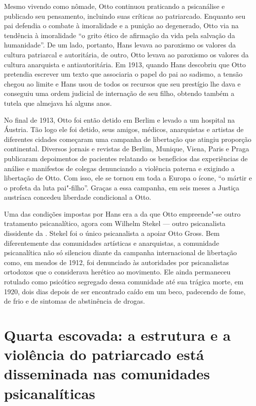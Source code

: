 Mesmo vivendo como nômade, Otto continuou praticando a psicanálise e
publicado seu pensamento, incluindo suas críticas ao patriarcado.
Enquanto seu pai defendia o combate à imoralidade e a punição ao
degenerado, Otto via na tendência à imoralidade ``o grito ético de
afirmação da vida pela salvação da humanidade''. De um lado, portanto,
Hans levava ao paroxismo os valores da cultura patriarcal e autoritária,
de outro, Otto levava ao paroxismo os valores da cultura anarquista e
antiautoritária. Em 1913, quando Hans descobriu que Otto pretendia
escrever um texto que associaria o papel do pai ao sadismo, a tensão
chegou ao limite e Hans usou de todos os recursos que seu prestígio lhe
dava e conseguiu uma ordem judicial de internação de seu filho, obtendo
também a tutela que almejava há alguns anos.

No final de 1913, Otto foi então detido em Berlim e levado a um hospital
na Áustria. Tão logo ele foi detido, seus amigos, médicos, anarquistas e
artistas de diferentes cidades começaram uma campanha de libertação que
atingiu proporção continental. Diversos jornais e revistas de Berlim,
Munique, Viena, Paris e Praga publicaram depoimentos de pacientes
relatando os benefícios das experiências de análise e manifestos de
colegas denunciando a violência paterna e exigindo a libertação de Otto.
Com isso, ele se tornou em toda a Europa o ícone, ``o mártir e o profeta
da luta pai"-filho''. Graças a essa campanha, em seis meses a Justiça
austríaca concedeu liberdade condicional a Otto.

Uma das condições impostas por Hans era a da que Otto empreende"-se outro
tratamento psicanalítico, agora com Wilhelm Stekel --- outro psicanalista
dissidente da . Stekel foi o único psicanalista a apoiar Otto Gross.
Bem diferentemente das comunidades artísticas e anarquistas, a
comunidade psicanalítica não só silenciou diante da campanha
internacional de libertação como, em meados de 1912, foi denunciado às
autoridades por psicanalistas ortodoxos que o considerava herético ao
movimento. Ele ainda permaneceu rotulado como psicótico segregado dessa
comunidade até sua trágica morte, em 1920, dois dias depois de ser
encontrado caído em um beco, padecendo de fome, de frio e de sintomas de
abstinência de drogas.

\section{Quarta escovada: a estrutura e a violência do patriarcado está
disseminada nas comunidades psicanalíticas}

